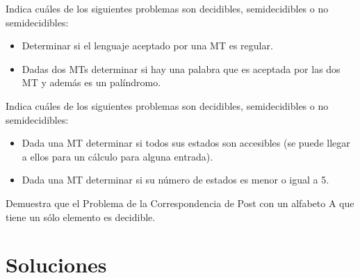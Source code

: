
\begin{ejercicio}
    Indica cuáles de los siguientes problemas son decidibles, semidecidibles o no semidecidibles:
    \begin{itemize}
        \item[a)] Determinar si el lenguaje aceptado por una MT es regular. %
        \item[b)] Dadas dos MTs determinar si hay una palabra que es aceptada por las dos MT y además es un palíndromo. %
    \end{itemize}
\end{ejercicio}


\begin{ejercicio}
    Indica cuáles de los siguientes problemas son decidibles, semidecidibles o no semidecidibles:
    \begin{itemize}
        \item[a)] Dada una MT determinar si todos sus estados son accesibles (se puede llegar a ellos para un cálculo para alguna entrada).
        \item[b)] Dada una MT determinar si su número de estados es menor o igual a 5.
    \end{itemize}
\end{ejercicio}


\begin{ejercicio}
    Demuestra que el Problema de la Correspondencia de Post con un alfabeto A que tiene un sólo elemento es decidible.
\end{ejercicio}

\newpage
\section{Soluciones}
\setcounter{ejercicio}{7}


